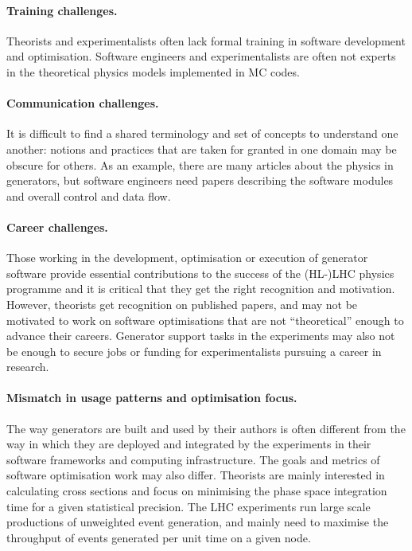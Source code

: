 \paragraph{Training challenges.} Theorists and experimentalists often
lack formal training in software development and optimisation. Software
engineers and experimentalists are often not experts in the theoretical
physics models implemented in MC codes.

\paragraph{Communication challenges.} It is difficult to find a shared
terminology and set of concepts to understand one another: notions and
practices that are taken for granted in one domain may be obscure for
others. As an example, there are many articles about the physics in
generators, but software engineers need papers describing the software
modules and overall control and data flow.

\paragraph{Career challenges.} Those working in the development, optimisation or
execution of generator software provide essential contributions to the
success of the (HL-)LHC physics programme and it is critical that they
get the right recognition and motivation. However, theorists get
recognition on published papers, and may not be motivated to work on
software optimisations that are not ``theoretical'' enough to advance
their careers. Generator support tasks in the experiments may also not
be enough to secure jobs or funding for experimentalists pursuing a career
in research.

\paragraph{Mismatch in usage patterns and optimisation focus.} The way
generators are built and used by their authors is often different from
the way in which they are deployed and integrated by the experiments in
their software frameworks and computing infrastructure. The goals and
metrics of software optimisation work may also differ. Theorists are
mainly interested in calculating cross sections and focus on minimising
the phase space integration time for a given statistical precision. The
LHC experiments run large scale productions of unweighted event
generation, and mainly need to maximise the throughput of events
generated per unit time on a given node.

